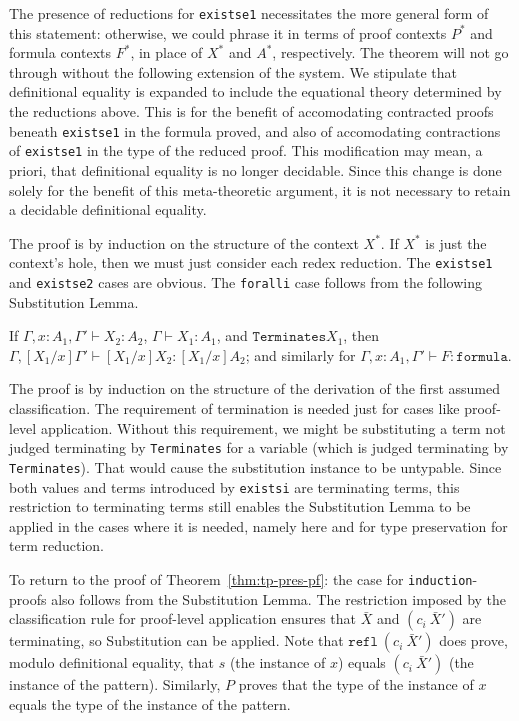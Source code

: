 \documentclass{fundam}
\newcommand{\seq}[3]{#1 \vdash #2 : #3}
\begin{document}
\noindent The presence of reductions for \texttt{existse1}
necessitates the more general form of this statement: otherwise, we
could phrase it in terms of proof contexts $P^*$ and formula contexts
$F^*$, in place of $X^*$ and $A^*$, respectively.  The theorem will
not go through without the following extension of the system.  We
stipulate that definitional equality is expanded to include the
equational theory determined by the reductions above.  This is for the
benefit of accomodating contracted proofs beneath \texttt{existse1} in
the formula proved, and also of accomodating contractions of
\texttt{existse1} in the type of the reduced proof.  This modification
may mean, a priori, that definitional equality is no longer decidable.
Since this change is done solely for the benefit of this
meta-theoretic argument, it is not necessary to retain a decidable
definitional equality.

The proof is by induction on the structure of the context $X^*$.  If
$X^*$ is just the context's hole, then we must just consider each
redex reduction.  The \texttt{existse1} and \texttt{existse2} cases
are obvious.  The \texttt{foralli} case follows from the following
Substitution Lemma.

\begin{lemma}[Substitution]
If $\seq{\Gamma,x:A_1,\Gamma'}{X_2}{A_2}$, $\seq{\Gamma}{X_1}{A_1}$,
and $\texttt{Terminates} X_1$, then
$\seq{\Gamma,[X_1/x]\Gamma'}{[X_1/x]X_2}{[X_1/x]A_2}$; and similarly
for $\seq{\Gamma,x:A_1,\Gamma'}{F}{\texttt{formula}}$.
\end{lemma}

The proof is by induction on the structure of the derivation of the
first assumed classification.  The requirement of termination is
needed just for cases like proof-level application.  Without this
requirement, we might be substituting a term not judged terminating by
\texttt{Terminates} for a variable (which is judged terminating by
\texttt{Terminates}).  That would cause the substitution instance to
be untypable.  Since both values and terms introduced by
\texttt{existsi} are terminating terms, this restriction to
terminating terms still enables the Substitution Lemma to be applied
in the cases where it is needed, namely here and for type preservation
for term reduction.

To return to the proof of Theorem~\ref{thm:tp-pres-pf}: the case for
\texttt{induction}-proofs also follows from the Substitution Lemma.
The restriction imposed by the classification rule for proof-level
application ensures that $\bar{X}$ and $(c_i\ \bar{X}')$ are
terminating, so Substitution can be applied.  Note that
$\texttt{refl}\ (c_i\ \bar{X}')$ does prove, modulo definitional
equality, that $s$ (the instance of $x$) equals $(c_i\ \bar{X}')$ (the
instance of the pattern).  Similarly, $P$ proves that the type of the
instance of $x$ equals the type of the instance of the pattern.
\end{document}
